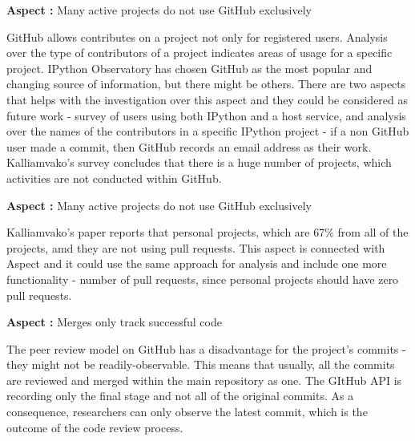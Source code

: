 \vspace{5mm}
\begin{mdframed}
\vspace{1px}
\textbf{Aspect :}  Many active projects do not use GitHub exclusively
\vspace{1px}
\end{mdframed}
\vspace{2mm}

GitHub allows contributes on a project not only for registered users. Analysis over the type of contributors of a project indicates areas of usage for a specific project. IPython Observatory has chosen GitHub as the most popular and changing source of information, but there might be others. There are two aspects that helps with the investigation over this aspect and they could be considered as future work - survey of users using both IPython and a host service, and analysis over the names of the contributors in a specific IPython project - if a non GitHub user made a commit, then GitHub records an email address as their work\cite{kalliamvakoupromises}. Kalliamvako's survey\cite{kalliamvakoupromises} concludes that there is a huge number of projects, which activities are not conducted within GitHub.

\vspace{5mm}
\begin{mdframed}
\vspace{1px}
\textbf{Aspect :}  Many active projects do not use GitHub exclusively
\vspace{1px}
\end{mdframed}
\vspace{2mm}

Kalliamvako's paper\cite{kalliamvakoupromises} reports that personal projects, which are 67\% from all of the projects, amd they are not using pull requests. This aspect is connected with Aspect  and it could use the same approach for analysis and include one more functionality - number of pull requests, since personal projects should have zero pull requests.

\vspace{5mm}
\begin{mdframed}
\vspace{1px}
\textbf{Aspect :}  Merges only track successful code
\vspace{1px}
\end{mdframed}
\vspace{2mm}

The peer review model on GitHub has a disadvantage for the project's commits - they might not be readily-observable. This means that usually, all the commits are reviewed and merged within the main repository as one. The GItHub API\cite{gitHubAPI} is recording only the final stage and not all of the original commits. As a consequence, researchers can only observe the latest commit, which is the outcome of the code review process\cite{kalliamvakoupromises}.

